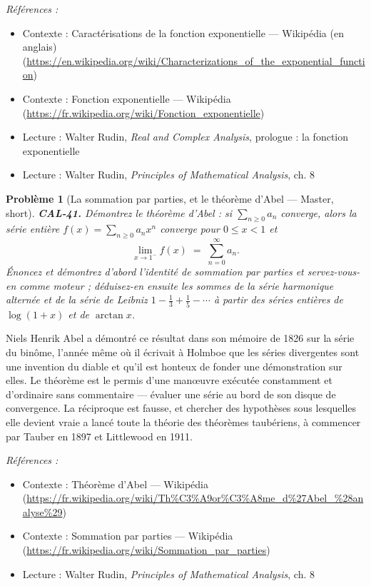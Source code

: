\documentclass[11pt]{article}
\newtheorem{problem}{Problème}
\newenvironment{refs}{\par\small\noindent\emph{Références :}\begin{itemize}\setlength\itemsep{0pt}}{\end{itemize}\normalsize}
\begin{document}
\begin{refs}
\item Contexte : Caractérisations de la fonction exponentielle --- Wikipédia (en anglais) (\url{https://en.wikipedia.org/wiki/Characterizations_of_the_exponential_function})
\item Contexte : Fonction exponentielle --- Wikipédia (\url{https://fr.wikipedia.org/wiki/Fonction_exponentielle})
\item Lecture : Walter Rudin, \textit{Real and Complex Analysis}, prologue : la fonction exponentielle
\item Lecture : Walter Rudin, \textit{Principles of Mathematical Analysis}, ch. 8
\end{refs}

\bigskip

\begin{problem}[{La sommation par parties, et le théorème d'Abel --- Master, short}]
\textbf{CAL-41.} Démontrez le théorème d'Abel : si $ \sum_{n\ge0} a_n $
converge, alors la série entière $ f(x) = \sum_{n\ge 0} a_n x^n $ converge pour
$ 0 \le x < 1 $ et
\[ \lim_{x\to 1^{-}} f(x) \;=\; \sum_{n=0}^{\infty} a_n . \]
Énoncez et démontrez d'abord l'identité de sommation par parties et servez-vous-en comme moteur ; déduisez-en ensuite les
sommes de la série harmonique alternée et de la série de Leibniz
$ 1 - \frac13 + \frac15 - \cdots $ à partir des séries entières de $ \log(1+x) $ et de
$ \arctan x $.
\end{problem}

\noindent Niels Henrik Abel a démontré ce résultat dans son mémoire de 1826 sur la série du binôme, l'année
même où il écrivait à Holmboe que les séries divergentes sont \og{} une invention du diable \fg{}
et qu'il est honteux de fonder une démonstration sur elles. Le théorème est le permis d'une man\oe{}uvre
exécutée constamment et d'ordinaire sans commentaire --- évaluer une série au bord de son disque de
convergence. La réciproque est fausse, et chercher des hypothèses sous lesquelles elle devient vraie a lancé
toute la théorie des théorèmes taubériens, à commencer par Tauber en 1897 et Littlewood en
1911.

\begin{refs}
\item Contexte : Théorème d'Abel --- Wikipédia (\url{https://fr.wikipedia.org/wiki/Th%C3%A9or%C3%A8me_d%27Abel_%28analyse%29})
\item Contexte : Sommation par parties --- Wikipédia (\url{https://fr.wikipedia.org/wiki/Sommation_par_parties})
\item Lecture : Walter Rudin, \textit{Principles of Mathematical Analysis}, ch. 8
\end{refs}
\end{document}
